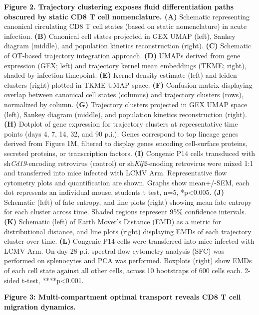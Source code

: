 \textbf{Figure 2. Trajectory clustering exposes fluid differentiation
paths obscured by static CD8 T cell nomenclature. (A)} Schematic
representing canonical circulating CD8 T cell states (based on static
nomenclature) in acute infection. \textbf{(B)} Canonical cell states
projected in GEX UMAP (left), Sankey diagram (middle), and population
kinetics reconstruction (right). \textbf{(C)} Schematic of OT-based
trajectory integration approach. \textbf{(D)} UMAPs derived from gene
expression (GEX; left) and trajectory kernel mean embeddings (TKME;
right), shaded by infection timepoint. \textbf{(E)} Kernel density
estimate (left) and leiden clusters (right) plotted in TKME UMAP space.
\textbf{(F)} Confusion matrix displaying overlap between canonical cell
states (columns) and trajectory clusters (rows), normalized by column.
\textbf{(G)} Trajectory clusters projected in GEX UMAP space (left),
Sankey diagram (middle), and population kinetics reconstruction (right).
\textbf{(H)} Dotplot of gene expression for trajectory clusters at
representative time points (days 4, 7, 14, 32, and 90 p.i.). Genes
correspond to top lineage genes derived from Figure 1M, filtered to
display genes encoding cell-surface proteins, secreted proteins, or
transcription factors. \textbf{(I)} Congenic P14 cells transduced with
sh\emph{Cd19}-encoding retrovirus (control) or sh\emph{Klf2}-enoding
retrovirus were mixed 1:1 and transferred into mice infected with LCMV
Arm. Representative flow cytometry plots and quantification are shown.
Graphs show mean+/-SEM, each dot represents an individual mouse,
students t test, n=5, *p\textless{}0.005. \textbf{(J)} Schematic (left)
of fate entropy, and line plots (right) showing mean fate entropy for
each cluster across time. Shaded regions represent 95\% confidence
intervals. \textbf{(K)} Schematic (left) of Earth Mover's Distance (EMD)
as a metric for distributional distance, and line plots (right)
displaying EMDs of each trajectory cluster over time. \textbf{(L)}
Congenic P14 cells were transferred into mice infected with LCMV Arm. On
day 28 p.i. spectral flow cytometry analysis (SFC) was performed on
splenocytes and PCA was performed. Boxplots (right) show EMDs of each
cell state against all other cells, across 10 bootstraps of 600 cells
each. 2-sided t-test, ****p\textless{}0.001.

\textbf{Figure 3: Multi-compartment optimal transport reveals CD8 T cell
migration dynamics.}

